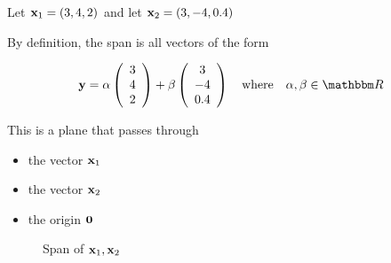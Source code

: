 \begin{frame}

    \vspace{2em}
    \Eg
    Let ${\mathbf x}_1 = (3, 4, 2)$ and let ${\mathbf x}_2 = (3, -4, 0.4)$

    \vspace{1em}
    By definition, the span is all vectors of the form


    \begin{equation*}
        \boldy = 
        \alpha \left(
        \begin{array}{c}
            3 \\
            4 \\
            2
        \end{array}
        \right)
        +
        \beta \left(
        \begin{array}{c}
             3 \\
             -4 \\
             0.4
        \end{array}
        \right)
        \quad \text{where} \quad
        \alpha, \beta \in \RR
    \end{equation*}
    
    This is a plane that passes through
    \begin{itemize}
        \item the vector ${\mathbf x}_1$
        \item the vector ${\mathbf x}_2$
        \item the origin ${\mathbf 0}$
    \end{itemize}


\end{frame}


\begin{frame}

    \vspace{2em}
   \begin{figure}
       \caption{\label{f:span_plane} Span of ${\mathbf x}_1, {\mathbf x}_2$}
   \end{figure}

\end{frame}




